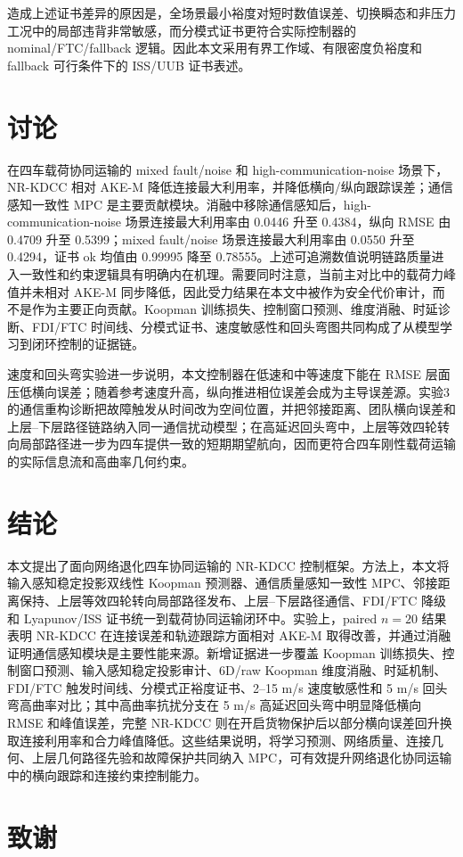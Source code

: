 \documentclass[twocolumn,3p,times,procedia]{elsarticle}
\newcommand{\todozh}[1]{\textcolor{red}{[待补：#1]}}
\newif\ifNRReview
\renewcommand{\todozh}[1]{\ifNRReview\textcolor{red}{[待补：#1]}\fi}
\newcommand{\AKE}{AKE-M}
\newcommand{\Method}{NR-KDCC}
\begin{document}
造成上述证书差异的原因是，全场景最小裕度对短时数值误差、切换瞬态和非压力工况中的局部违背非常敏感，而分模式证书更符合实际控制器的 nominal/FTC/fallback 逻辑。因此本文采用有界工作域、有限密度负裕度和 fallback 可行条件下的 ISS/UUB 证书表述。

\FloatBarrier

\section{讨论}

在四车载荷协同运输的 mixed fault/noise 和 high-communication-noise 场景下，\Method{} 相对 \AKE{} 降低连接最大利用率，并降低横向/纵向跟踪误差；通信感知一致性 MPC 是主要贡献模块。消融中移除通信感知后，high-communication-noise 场景连接最大利用率由 0.0446 升至 0.4384，纵向 RMSE 由 0.4709 升至 0.5399；mixed fault/noise 场景连接最大利用率由 0.0550 升至 0.4294，证书 ok 均值由 0.99995 降至 0.78555。上述可追溯数值说明链路质量进入一致性和约束逻辑具有明确内在机理。需要同时注意，当前主对比中的载荷力峰值并未相对 \AKE{} 同步降低，因此受力结果在本文中被作为安全代价审计，而不是作为主要正向贡献。Koopman 训练损失、控制窗口预测、维度消融、时延诊断、FDI/FTC 时间线、分模式证书、速度敏感性和回头弯图共同构成了从模型学习到闭环控制的证据链。

速度和回头弯实验进一步说明，本文控制器在低速和中等速度下能在 RMSE 层面压低横向误差；随着参考速度升高，纵向推进相位误差会成为主导误差源。实验3的通信重构诊断把故障触发从时间改为空间位置，并把邻接距离、团队横向误差和上层--下层路径链路纳入同一通信扰动模型；在高延迟回头弯中，上层等效四轮转向局部路径进一步为四车提供一致的短期期望航向，因而更符合四车刚性载荷运输的实际信息流和高曲率几何约束。


\section{结论}

本文提出了面向网络退化四车协同运输的 \Method{} 控制框架。方法上，本文将输入感知稳定投影双线性 Koopman 预测器、通信质量感知一致性 MPC、邻接距离保持、上层等效四轮转向局部路径发布、上层--下层路径通信、FDI/FTC 降级和 Lyapunov/ISS 证书统一到载荷协同运输闭环中。实验上，paired $n=20$ 结果表明 \Method{} 在连接误差和轨迹跟踪方面相对 \AKE{} 取得改善，并通过消融证明通信感知模块是主要性能来源。新增证据进一步覆盖 Koopman 训练损失、控制窗口预测、输入感知稳定投影审计、6D/raw Koopman 维度消融、时延机制、FDI/FTC 触发时间线、分模式正裕度证书、2--15 m/s 速度敏感性和 5 m/s 回头弯高曲率对比；其中高曲率抗扰分支在 5 m/s 高延迟回头弯中明显降低横向 RMSE 和峰值误差，完整 \Method{} 则在开启货物保护后以部分横向误差回升换取连接利用率和合力峰值降低。这些结果说明，将学习预测、网络质量、连接几何、上层几何路径先验和故障保护共同纳入 MPC，可有效提升网络退化协同运输中的横向跟踪和连接约束控制能力。

\section*{致谢}

\todozh{补充基金项目、课题编号和作者贡献声明。}

\FloatBarrier
\balance


\end{document}
